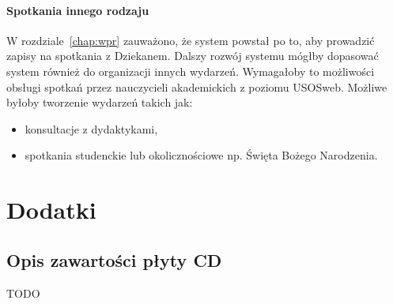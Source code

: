 \documentclass[licencjacka]{pracamgr}
\begin{document}
\subsubsection{Spotkania innego rodzaju}
W rozdziale~\ref{chap:wpr} zauważono, że system powstał po to, aby prowadzić zapisy na spotkania z Dziekanem. Dalszy rozwój systemu mógłby dopasować system również do organizacji innych wydarzeń. Wymagałoby to możliwości obsługi spotkań przez nauczycieli akademickich z poziomu USOSweb. Możliwe byłoby tworzenie wydarzeń takich jak:
\begin{itemize}
	\item konsultacje z dydaktykami,
	\item spotkania studenckie lub okolicznościowe np. Święta Bożego Narodzenia.
\end{itemize}

\chapter{Dodatki} \label{chap:dodatki}
\section{Opis zawartości płyty CD}
TODO
\end{document}
